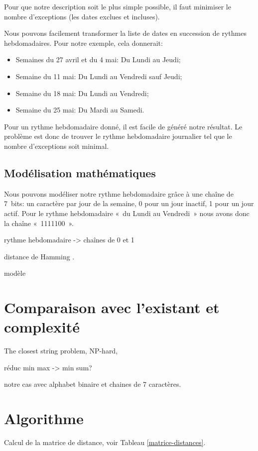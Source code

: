 \documentclass{roadef}
\begin{document}
Pour que notre description soit le plus simple possible, il faut
minimiser le nombre d'exceptions (les dates exclues et incluses).

Nous pouvons facilement transformer la liste de dates en succession de
rythmes hebdomadaires. Pour notre exemple, cela donnerait:
\begin{itemize}
\item Semaines du 27 avril et du 4 mai: Du Lundi au Jeudi;
\item Semaine du 11 mai: Du Lundi au Vendredi sauf Jeudi;
\item Semaine du 18 mai: Du Lundi au Vendredi;
\item Semaine du 25 mai: Du Mardi au Samedi.
\end{itemize}

Pour un rythme hebdomadaire donné, il est facile de généré notre
résultat.  Le problème est donc de trouver le rythme hebdomadaire
journalier tel que le nombre d'exceptions soit minimal.

\subsection{Modélisation mathématiques}

Nous pouvons modéliser notre rythme hebdomadaire grâce à une chaîne de
7~bits: un caractère par jour de la semaine, 0 pour un jour inactif, 1
pour un jour actif. Pour le rythme hebdomadaire «~du Lundi au
Vendredi~» nous avons donc la chaîne «~1111100~».

rythme hebdomadaire -> chaînes de 0 et 1

distance de Hamming \cite{hamming1950error}.

modèle

\section{Comparaison avec l'existant et complexité}

The closest string problem, NP-hard, \cite{lanctot2003distinguishing}

réduc min max -> min sum?

notre cas avec alphabet binaire et chaines de 7 caractères.

\section{Algorithme}

Calcul de la matrice de distance, voir Tableau \ref{matrice-distances}.
\end{document}
